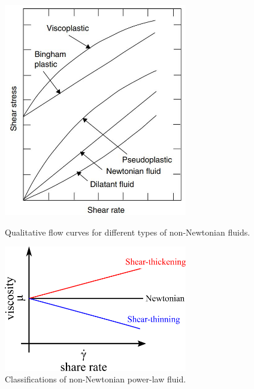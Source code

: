 \begin{center}
    \begin{figure}[h]
        \centering
        \includegraphics[width=8.0cm,clip]{1-Background/1-fluid-curve.jpg}
        \caption{Qualitative flow curves for different types of non-Newtonian fluids\cite{ref:1}.}
        \label{fig:1-fluid-curve}
        \centering
        \includegraphics[width=8.0cm,clip]{1-Background/2-Newton-fluid.png}
        \caption{Classifications of non-Newtonian power-law fluid.}
        \label{fig:2-Newton-fluid}
    \end{figure}


\end{center}
